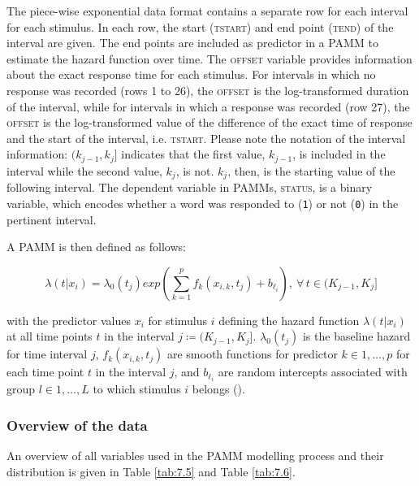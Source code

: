 The piece-wise exponential data format contains a separate row for each interval for each stimulus. In each row, the start (\textsc{tstart}) and end point (\textsc{tend}) of the interval are given. The end points are included as predictor in a PAMM to estimate the hazard function over time. The \textsc{offset} variable provides information about the exact response time for each stimulus. For intervals in which no response was recorded (rows 1 to 26), the \textsc{offset} is the log-transformed duration of the interval, while for intervals in which a response was recorded (row 27), the \textsc{offset} is the log-transformed value of the difference of the exact time of response and the start of the interval, i.e. \textsc{tstart}. Please note the notation of the interval information: $(k_{j-1},k_j]$ indicates that the first value, $k_{j-1}$, is included in the interval while the second value, $k_j$, is not. $k_j$, then, is the starting value of the following interval. The dependent variable in PAMMs, \textsc{status}, is a binary variable, which encodes whether a word was responded to (\texttt{1}) or not (\texttt{0}) in the pertinent interval. 

A PAMM is then defined as follows:

\begin{equation}
\label{eq:lambdatxi}
\lambda(t|x_{i})=\lambda_{0}(t_{j})exp\left ( \sum_{k=1}^{p}f_{k}(x_{i,k},t_{j})+b_{\ell_{i}} \right ),\: \forall\, t \in (K_{j-1},K_{j}]
\end{equation}

with the predictor values $x_i$ for stimulus $i$ defining the hazard function $\lambda(t|x_{i})$ at all time points $t$ in the interval $j≔(K_{j-1},K_j]$. $λ_0 (t_j)$ is the baseline hazard for time interval $j$, $f_k (x_{i,k},t_j)$ are smooth functions for predictor $k∈1,…,p$ for each time point $t$ in the interval $j$, and $b_{\ell_{i}}$ are random intercepts associated with group $l∈1,…,L$ to which stimulus $i$ belongs (\cite{Hendrix2020}).

\subsubsection{Overview of the data}\label{section07_2_2_1}

An overview of all variables used in the PAMM modelling process and their distribution is given in Table \ref{tab:7.5} and Table \ref{tab:7.6}.

